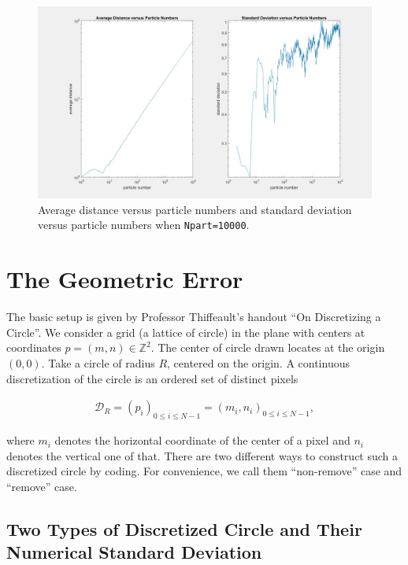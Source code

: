 \documentclass[letterpaper]{article}
\numberwithin{equation}{section} %
\numberwithin{figure}{section} %
\numberwithin{table}{section} %
\begin{document}
\begin{figure}[h]
	\centering
	\includegraphics[width=0.9\linewidth]{bdryRandSTD}
	\caption{Average distance versus particle numbers and standard deviation versus particle numbers when \texttt{Npart=10000}.}
	\label{fig:bdryRandSTD}
\end{figure}








\section{The Geometric Error}

The basic setup is given by Professor Thiffeault's handout \enquote{On Discretizing a Circle}. We consider a grid (a lattice of circle) in the plane with centers at coordinates $p=(m, n)\in\mathbb{Z}^2$. The center of circle drawn locates at the origin $(0,0)$. Take a circle of radius $R$, centered on the origin. A continuous discretization of the circle is an ordered set of distinct pixels 

\begin{align} 
\mathcal{D}_R=(p_{i})_{0 \leq i \leq N-1} = (m_i, n_i)_{0 \leq i \leq N-1},
\end{align}

\noindent
where $m_i$ denotes the horizontal coordinate of the center of a pixel and $n_i$ denotes the vertical one of that. There are two different ways to construct such a discretized circle by coding. For convenience, we call them \enquote{non-remove} case and \enquote{remove} case.


\subsection{Two Types of Discretized Circle and Their Numerical Standard Deviation}
\end{document}
